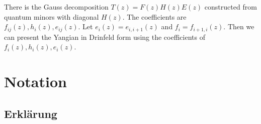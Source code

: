 \documentclass[11pt]{report}
\theoremstyle{definition}
\theoremstyle{remark}
\theoremstyle{remark}
\begin{document}
There is the Gauss decomposition $T(z) = F(z) H(z) E(z)$ constructed from quantum minors with diagonal $H(z)$. The coefficients are $f_{ij}(z), h_i(z), e_{ij}(z)$. Let $e_i(z) = e_{i,i+1}(z)$ and $f_i = f_{i+1,i}(z)$. Then we can present the Yangian in Drinfeld form using the coefficients of $f_i(z),h_i(z),e_i(z)$.

\pagebreak

\chapter*{Notation}\label{chapter:notation}

\pagebreak

\printindex




\pagebreak

\section*{Erklärung}
\end{document}
